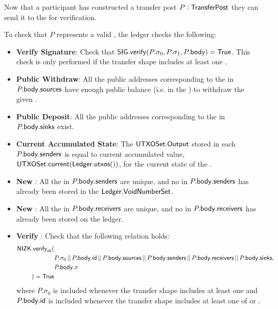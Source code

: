 Now that a participant has constructed a transfer post $P : {\textsf{TransferPost}}$ they can send it to the \Ledger{} for verification. 

\begin{definition}
    To check that $P$ represents a valid \Transfer{}, the ledger checks the following:
    \begin{itemize}
        \item \textbf{Verify Signature}: Check that ${\textsf{SIG}}.{\textsf{verify}}(P.\sigma_0, P.\sigma_1, P.{\textsf{body}}) = {\textsf{True}}$. This check is only performed if the transfer shape includes at least one \Sender{}.
        \item \textbf{Public Withdraw}: All the public addresses corresponding to the  in $P.{\textsf{body}}.{\textsf{sources}}$ have enough public balance (i.e. in the \PublicLedger{}) to withdraw the given \Asset{}.
        \item \textbf{Public Deposit}: All the public addresses corresponding to the  in $P.{\textsf{body}}.{\textsf{sinks}}$ exist.
        \item \textbf{Current Accumulated State}: The ${\textsf{UTXOSet}}.{\textsf{Output}}$ stored in each $P.{\textsf{body}}.{\textsf{senders}}$ is equal to current accumulated value, ${\textsf{UTXOSet}}.{\textsf{current}}({\textsf{Ledger}}.{\textsf{utxos}}())$, for the current state of the \Ledger{}.
        \item \textbf{New }: All the  in $P.{\textsf{body}}.{\textsf{senders}}$ are unique, and no \VoidNumber{} in $P.{\textsf{body}}.{\textsf{senders}}$ has already been stored in the ${\textsf{Ledger}}.{\textsf{VoidNumberSet}}$.
        \item \textbf{New }: All the  in $P.{\textsf{body}}.{\textsf{receivers}}$ are unique, and no \UTXO{} in $P.{\textsf{body}}.{\textsf{receivers}}$ has already been stored on the ledger.
        \item \textbf{Verify \Transfer{}}: Check that the following relation holds:
            \begin{align*}
                {\textsf{NIZK}}.{\textsf{verify}}_{\textsf{vk}}(& \\
                    &P.\sigma_0 \,||\, P.{\textsf{body}}.{\textsf{id}} \,||\, P.{\textsf{body}}.{\textsf{sources}} \,||\, P.{\textsf{body}}.{\textsf{senders}} \,||\, P.{\textsf{body}}.{\textsf{receivers}} \,||\, P.{\textsf{body}}.{\textsf{sinks}}, \\
                    &P.{\textsf{body}}.\pi \\
                ) = {\textsf{True}}
            \end{align*}
            where $P.\sigma_0$ is included whenever the transfer shape includes at least one \Sender{} and $P.{\textsf{body}}.{\textsf{id}}$ is included whenever the transfer shape includes at least one of  or .
    \end{itemize}
\end{definition}


